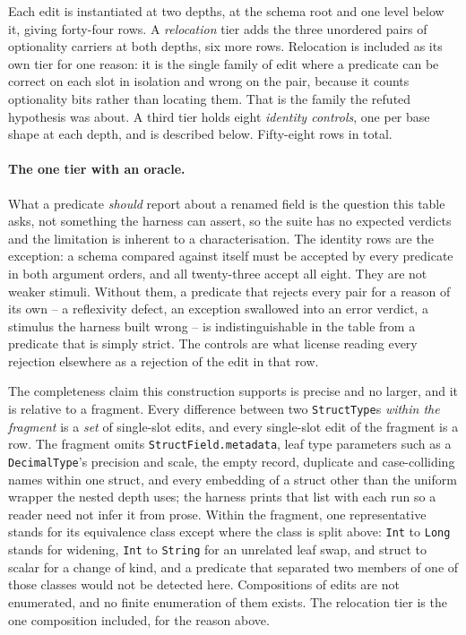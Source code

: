 Each edit is instantiated at two depths, at the schema root and one level below it, giving forty-four rows. A \emph{relocation} tier adds the three unordered pairs of optionality carriers at both depths, six more rows. Relocation is included as its own tier for one reason: it is the single family of edit where a predicate can be correct on each slot in isolation and wrong on the pair, because it counts optionality bits rather than locating them. That is the family the refuted hypothesis was about. A third tier holds eight \emph{identity controls}, one per base shape at each depth, and is described below. Fifty-eight rows in total.

\paragraph{The one tier with an oracle.} What a predicate \emph{should} report about a renamed field is the question this table asks, not something the harness can assert, so the suite has no expected verdicts and the limitation is inherent to a characterisation. The identity rows are the exception: a schema compared against itself must be accepted by every predicate in both argument orders, and all twenty-three accept all eight. They are not weaker stimuli. Without them, a predicate that rejects every pair for a reason of its own -- a reflexivity defect, an exception swallowed into an error verdict, a stimulus the harness built wrong -- is indistinguishable in the table from a predicate that is simply strict. The controls are what license reading every rejection elsewhere as a rejection of the edit in that row.

The completeness claim this construction supports is precise and no larger, and it is relative to a fragment. Every difference between two \texttt{StructType}s \emph{within the fragment} is a \emph{set} of single-slot edits, and every single-slot edit of the fragment is a row. The fragment omits \texttt{StructField.metadata}, leaf type parameters such as a \texttt{DecimalType}'s precision and scale, the empty record, duplicate and case-colliding names within one struct, and every embedding of a struct other than the uniform wrapper the nested depth uses; the harness prints that list with each run so a reader need not infer it from prose. Within the fragment, one representative stands for its equivalence class except where the class is split above: \texttt{Int} to \texttt{Long} stands for widening, \texttt{Int} to \texttt{String} for an unrelated leaf swap, and struct to scalar for a change of kind, and a predicate that separated two members of one of those classes would not be detected here. Compositions of edits are not enumerated, and no finite enumeration of them exists. The relocation tier is the one composition included, for the reason above.

